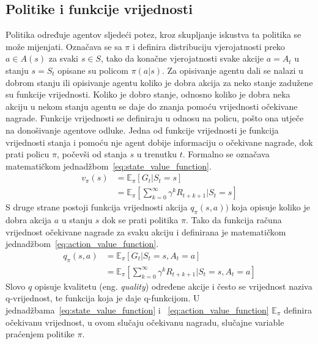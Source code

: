 \subsection{Politike i funkcije vrijednosti}
Politika određuje agentov sljedeći potez, kroz skupljanje iskustva ta politika se može mijenjati. Označava se sa $\pi$ i definira distribuciju vjerojatnosti preko $a \in A(s)$ za svaki $s \in S$, tako da konačne vjerojatnosti svake akcije $a = A_t$ u stanju $s = S_t$ opisane su policom $\pi(a|s)$.
Za opisivanje agentu dali se nalazi u dobrom stanju ili opisivanje agentu koliko je dobra akcija za neko stanje zadužene su funkcije vrijednosti. Koliko je dobro stanje, odnosno koliko je dobra neka akciju u nekom stanju agentu se daje do znanja pomoću vrijednosti očekivane nagrade. Funkcije vrijednosti se definiraju u odnosu na policu, pošto ona utječe na donošivanje agentove odluke.
Jedna od funkcije vrijednosti je funkcija vrijednosti stanja i pomoću nje agent dobije informaciju o očekivane nagrade, dok prati policu $\pi$, počevši od stanja $s$ u trenutku $t$. Formalno se označava matematičkom jednadžbom~\ref{eq:state_value_function}.
\begin{equation}\label{eq:state_value_function}
	\begin{split}
		v_\pi(s) &= \mathbb{E}_\pi[G_t | S_t = s] \\
				 &= \mathbb{E}_\pi\left[\sum_{k=0}^{\infty} \gamma^k R_{t+k+1} | S_t = s\right]
     \end{split}
\end{equation}
S druge strane postoji funkcija vrijednosti akcija $q_\pi(s, a))$ koja opisuje koliko je dobra akcija $a$ u stanju $s$ dok se prati politika $\pi$. Tako da funkcija računa vrijednost očekivane nagrade za svaku akciju i definirana je matematičkom jednadžbom~\ref{eq:action_value_function}.
\begin{equation}\label{eq:action_value_function}
\begin{split}
q_\pi(s, a) &= \mathbb{E}_\pi[G_t | S_t = s, A_t = a] \\
&= \mathbb{E}_\pi\left[\sum_{k=0}^{\infty} \gamma^k R_{t+k+1} | S_t = s, A_t = a\right]
\end{split}
\end{equation}
Slovo $q$ opisuje kvalitetu (eng. \textit{quality}) određene akcije i često se vrijednost naziva q-vrijednost, te funkcija koja je daje q-funkcijom. U jednadžbama~\ref{eq:state_value_function} i ~\ref{eq:action_value_function} $\mathbb{E}_\pi$ definira očekivanu vrijednost, u ovom slučaju očekivanu nagradu, slučajne variable praćenjem politike $\pi$.

